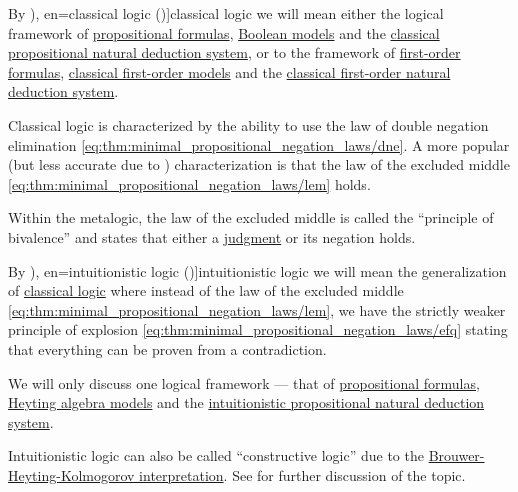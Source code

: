 \begin{definition}\label{def:classical_logic}
  By \term[ru=классическая логика (\cite[58]{ШеньВерещагин2017Языки}), en=classical logic (\cite[8]{TroelstraSchwichtenberg2000})]{classical logic} we will mean either the logical framework of \hyperref[def:propositional_syntax/formula]{propositional formulas}, \hyperref[def:propositional_model]{Boolean models} and the \hyperref[def:classical_propositional_deductive_system]{classical propositional natural deduction system}, or to the framework of \hyperref[def:first_order_syntax/formula]{first-order formulas}, \hyperref[def:first_order_model]{classical first-order models} and the \hyperref[def:first_order_natural_deduction_system]{classical first-order natural deduction system}.

  Classical logic is characterized by the ability to use the law of double negation elimination \eqref{eq:thm:minimal_propositional_negation_laws/dne}. A more popular (but less accurate due to ) characterization is that the law of the excluded middle \eqref{eq:thm:minimal_propositional_negation_laws/lem} holds.
\end{definition}
\begin{comments}
  \item Within the metalogic, the law of the excluded middle is called the \enquote{principle of bivalence} and states that either a \hyperref[def:judgment]{judgment} or its negation holds.
\end{comments}

\begin{remark}\label{def:intuitionistic_logic}
  By \term[ru=интуиционисткая логика (\cite[58]{ШеньВерещагин2017Языки}), en=intuitionistic logic (\cite[8]{TroelstraSchwichtenberg2000})]{intuitionistic logic} we will mean the generalization of \hyperref[def:classical_logic]{classical logic} where instead of the law of the excluded middle \eqref{eq:thm:minimal_propositional_negation_laws/lem}, we have the strictly weaker principle of explosion \eqref{eq:thm:minimal_propositional_negation_laws/efq} stating that everything can be proven from a contradiction.

  We will only discuss one logical framework --- that of \hyperref[def:propositional_formula]{propositional formulas}, \hyperref[def:propositional_heyting_algebra_semantics]{Heyting algebra models} and the \hyperref[def:intuitionistic_propositional_deductive_systems]{intuitionistic propositional natural deduction system}.
\end{remark}
\begin{comments}
  \item Intuitionistic logic can also be called \enquote{constructive logic} due to the \hyperref[con:brouwer_heyting_kolmogorov_interpretation]{Brouwer-Heyting-Kolmogorov interpretation}. See  for further discussion of the topic.
\end{comments}

